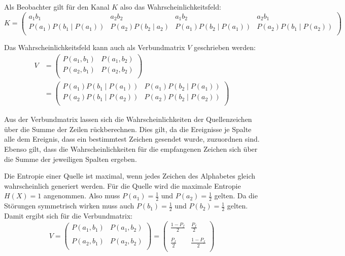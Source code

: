 Als Beobachter gilt für den Kanal $K$ also das Wahrscheinlichkeitsfeld:
$$
	K = 
	\left(
	\begin{array}{*{4}{c}}
		a_1b_1                          & a_2b_2           & a_1b_2                    & a_2b_1 \\
		P(a_1) P(b_1 \mid P(a_1)) & P(a_2) P(b_2 \mid a_2) & P(a_1) P(b_2 \mid P(a_1)) & P(a_2) P(b_1 \mid P(a_2)) \\
	\end{array}
	\right)
$$


Das Wahrscheinlichkeitsfeld kann auch als Verbundmatrix $V$ geschrieben werden:
\begin{align*}
	V &= \left(
	     \begin{array}{*{2}{c}}
	     	P(a_1,b_1) & P(a_1,b_2) \\
	     	P(a_2,b_1) & P(a_2,b_2) \\
	     \end{array}
	     \right) \\
	  &= \left(
	     \begin{array}{*{2}{c}}
	     	P(a_1) P(b_1 \mid P(a_1)) & P(a_1) P(b_2 \mid P(a_1)) \\
	     	P(a_2) P(b_1 \mid P(a_2)) & P(a_2) P(b_2 \mid P(a_2)) \\
	     \end{array}
	     \right)
\end{align*}

Aus der Verbundmatrix lassen sich die Wahrscheinlichkeiten der Quellenzeichen über die Summe der Zeilen rückberechnen. Dies gilt, da die Ereignisse je Spalte alle dem Ereignis, dass ein bestimmtest Zeichen gesendet wurde, zuzuordnen sind. Ebenso gilt, dass die Wahrscheinlichkeiten für die empfangenen Zeichen sich über die Summe der jeweiligen Spalten ergeben.

Die Entropie einer Quelle ist maximal, wenn jedes Zeichen des Alphabetes gleich wahrscheinlich generiert werden.
Für die Quelle wird die maximale Entropie $H(X) = 1$ angenommen.
Also muss $P(a_1) = \frac{1}{2}$ und $P(a_2) = \frac{1}{2}$ gelten.
Da die Störungen symmetrisch wirken muss auch $P(b_1) = \frac{1}{2}$ und $P(b_2) = \frac{1}{2}$ gelten.
Damit ergibt sich für die Verbundmatrix:
$$
V = 
\left(
\begin{array}{*{2}{c}}
	P(a_1,b_1) & P(a_1,b_2) \\
	\\
	P(a_2,b_1) & P(a_2,b_2) \\
\end{array}
\right)
=
\left(
\begin{array}{*{2}{c}}
 	\frac{1-P_f}{2} & \frac{P_f}{2} \\
 	\\
 	\frac{P_f}{2}   & \frac{1-P_f}{2} \\
\end{array}
\right)
$$

